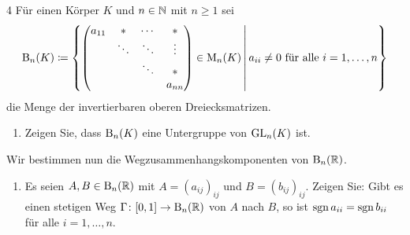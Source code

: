 

\begin{question}[subtitle = Die Wegzusammenhangskomponenten der oberen Dreiecksmatrizen]{4}
  Für einen Körper $K$ und $n \in \mathbb{N}$ mit $n \geq 1$ sei
  \[
    \operatorname{B}_n(K)
    \coloneqq
    \left\{
      \begin{pmatrix}
        a_{11}  & *       & \cdots  & *       \\
                & \ddots  & \ddots  & \vdots  \\
                &         & \ddots  & *       \\
                &         &         & a_{nn}
      \end{pmatrix}
      \in \operatorname{M}_n(K)
      \,\middle|\,
      \text{$a_{ii} \neq 0$ für alle $i = 1, \dotsc, n$}
    \right\}
  \]
  die Menge der invertierbaren oberen Dreiecksmatrizen.
  \begin{enumerate}[leftmargin=*]
    \item
      Zeigen Sie, dass $\operatorname{B}_n(K)$ eine Untergruppe von $\operatorname{GL}_n(K)$ ist.
  \end{enumerate}
  Wir bestimmen nun die Wegzusammenhangskomponenten von $\operatorname{B}_n(\mathbb{R})$.
  \begin{enumerate}[leftmargin=*, resume]
    \item
      Es seien $A, B \in \operatorname{B}_n(\mathbb{R})$ mit $A = (a_{ij})_{ij}$ und $B = (b_{ij})_{ij}$.
      Zeigen Sie:
      Gibt es einen stetigen Weg $\Gamma \colon [0,1] \to \operatorname{B}_n(\mathbb{R})$ von $A$ nach $B$, so ist $\operatorname{sgn} a_{ii} = \operatorname{sgn} b_{ii}$ für alle $i = 1, \dotsc, n$.
      

\end{enumerate}
\end{question}
